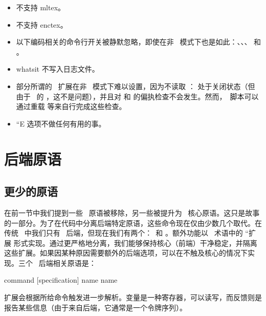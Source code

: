 \begin{itemize}\item 不支持 mltex。

\item 不支持 enctex。

\item 以下编码相关的命令行开关被静默忽略，即使在非 \LUA\ 模式下也是如此：、、、 和 。

\item {} whatsit 不写入日志文件。

\item 部分所谓的 \WEBC\ 扩展在非 \KPSE\ 模式下难以设置，因为不读取 ： 处于关闭状态（但由于 \LUA\ 的 ，这不是问题），并且对  和  的偏执检查不会发生。然而，\LUA\ 脚本可以通过重载  等来自行完成这些检查。

\item ``E 选项不做任何有用的事。

\end{itemize}

\section{后端原语}\label{backendprimitives}

\subsection{更少的原语}


在前一节中我们提到一些 \PDFTEX\ 原语被移除，另一些被提升为 \LUATEX\ 核心原语。这只是故事的一部分。为了在代码中分离后端特定原语，这些命令现在仅由少数几个取代。在传统 \TEX\ 中我们只有 \DVI\ 后端，但现在我们有两个：\DVI\ 和 \PDF。额外功能以 \TEX\ 术语中的 ``扩展 形式实现。通过更严格地分离，我们能够保持核心（前端）干净稳定，并隔离这些扩展。如果因某种原因需要额外的后端选项，可以在不触及核心的情况下实现。三个 \PDF\ 后端相关原语是：

\begin{typing}
\pdfextension command [specification]
\pdfvariable  name
\pdffeedback  name
\end{typing}

扩展会根据所给命令触发进一步解析。变量是一种寄存器，可以读写，而反馈则是报告某些信息（由于来自后端，它通常是一个令牌序列）。

